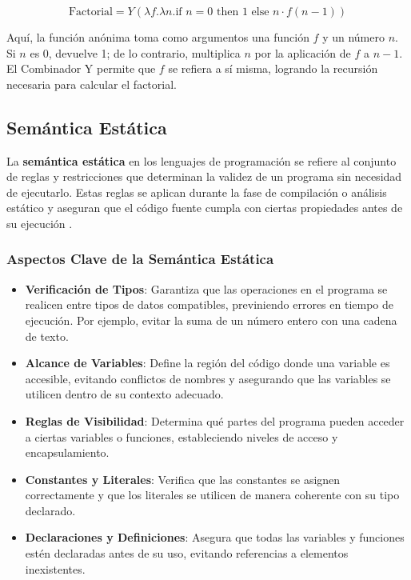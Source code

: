 \documentclass{article}
\begin{document}
  \[
  \text{Factorial} = Y(\lambda f. \lambda n. \text{if } n = 0 \text{ then } 1 \text{ else } n \cdot f(n-1))
  \]

  Aquí, la función anónima toma como argumentos una función \( f \) y un número \( n \). Si \( n \) es 0, devuelve 1; de lo contrario, multiplica \( n \) por la aplicación de \( f \) a \( n-1 \). El Combinador Y permite que \( f \) se refiera a sí misma, logrando la recursión necesaria para calcular el factorial.

  \subsection{Semántica Estática}

  La \textbf{semántica estática} en los lenguajes de programación se refiere al conjunto de reglas y restricciones que determinan la validez de un programa sin necesidad de ejecutarlo. Estas reglas se aplican durante la fase de compilación o análisis estático y aseguran que el código fuente cumpla con ciertas propiedades antes de su ejecución \cite{pierce2002types}.

  \subsubsection{Aspectos Clave de la Semántica Estática}

  \begin{itemize}
    \item \textbf{Verificación de Tipos}: Garantiza que las operaciones en el programa se realicen entre tipos de datos compatibles, previniendo errores en tiempo de ejecución. Por ejemplo, evitar la suma de un número entero con una cadena de texto.

    \item \textbf{Alcance de Variables}: Define la región del código donde una variable es accesible, evitando conflictos de nombres y asegurando que las variables se utilicen dentro de su contexto adecuado.

    \item \textbf{Reglas de Visibilidad}: Determina qué partes del programa pueden acceder a ciertas variables o funciones, estableciendo niveles de acceso y encapsulamiento.

    \item \textbf{Constantes y Literales}: Verifica que las constantes se asignen correctamente y que los literales se utilicen de manera coherente con su tipo declarado.

    \item \textbf{Declaraciones y Definiciones}: Asegura que todas las variables y funciones estén declaradas antes de su uso, evitando referencias a elementos inexistentes.
  \end{itemize}
\end{document}
